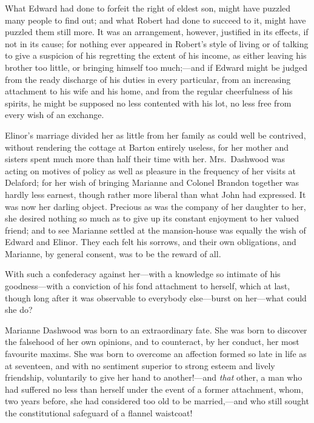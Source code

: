 \documentclass{article}
\begin{document}
What Edward had done to forfeit the right of eldest
son, might have puzzled many people to find out; and what
Robert had done to succeed to it, might have puzzled them
still more.  It was an arrangement, however, justified in
its effects, if not in its cause; for nothing ever
appeared in Robert's style of living or of talking to give
a suspicion of his regretting the extent of his income,
as either leaving his brother too little, or bringing
himself too much;---and if Edward might be judged from
the ready discharge of his duties in every particular,
from an increasing attachment to his wife and his home,
and from the regular cheerfulness of his spirits,
he might be supposed no less contented with his lot,
no less free from every wish of an exchange.

Elinor's marriage divided her as little from her
family as could well be contrived, without rendering
the cottage at Barton entirely useless, for her mother
and sisters spent much more than half their time with her.
Mrs.\ Dashwood was acting on motives of policy as well
as pleasure in the frequency of her visits at Delaford;
for her wish of bringing Marianne and Colonel Brandon together
was hardly less earnest, though rather more liberal than
what John had expressed.  It was now her darling object.
Precious as was the company of her daughter to her,
she desired nothing so much as to give up its constant
enjoyment to her valued friend; and to see Marianne settled at
the mansion-house was equally the wish of Edward and Elinor.
They each felt his sorrows, and their own obligations,
and Marianne, by general consent, was to be the reward
of all.

With such a confederacy against her---with a knowledge
so intimate of his goodness---with a conviction of his fond
attachment to herself, which at last, though long after it
was observable to everybody else---burst on her---what could she
do?

Marianne Dashwood was born to an extraordinary fate.
She was born to discover the falsehood of her own opinions,
and to counteract, by her conduct, her most favourite maxims.
She was born to overcome an affection formed so late
in life as at seventeen, and with no sentiment
superior to strong esteem and lively friendship,
voluntarily to give her hand to another!---and \emph{that} other,
a man who had suffered no less than herself under the
event of a former attachment, whom, two years before,
she had considered too old to be married,---and who still
sought the constitutional safeguard of a flannel waistcoat!
\end{document}
